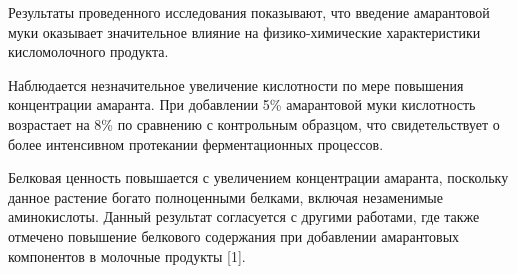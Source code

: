 {%

Результаты проведенного исследования показывают, что введение
амарантовой муки оказывает значительное влияние на физико-химические
характеристики кисломолочного продукта.

Наблюдается незначительное увеличение кислотности по мере повышения
концентрации амаранта. При добавлении 5\% амарантовой муки кислотность
возрастает на 8\% по сравнению с контрольным образцом, что
свидетельствует о более интенсивном протекании ферментационных
процессов.

Белковая ценность повышается с увеличением концентрации амаранта,
поскольку данное растение богато полноценными белками, включая
незаменимые аминокислоты. Данный результат согласуется с другими
работами, где также отмечено повышение белкового содержания при
добавлении амарантовых компонентов в молочные продукты {[}1{]}.

}
